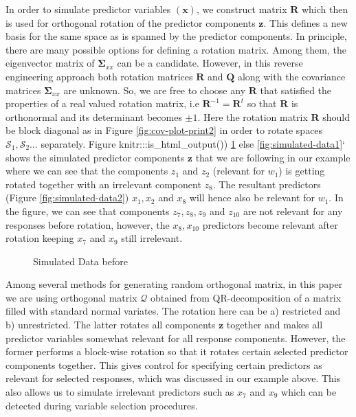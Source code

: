 \documentclass[3p,times,12pt,authoryear]{elsarticle}
\theoremstyle{definition}
\theoremstyle{definition}
\theoremstyle{remark}
\begin{document}
In order to simulate predictor variables \((\mathbf{x})\), we construct
matrix \(\mathbf{R}\) which then is used for orthogonal rotation of the
predictor components \(\mathbf{z}\). This defines a new basis for the
same space as is spanned by the predictor components. In principle,
there are many possible options for defining a rotation matrix. Among
them, the eigenvector matrix of \(\boldsymbol{\Sigma}_{xx}\) can be a
candidate. However, in this reverse engineering approach both rotation
matrices \(\mathbf{R}\) and \(\mathbf{Q}\) along with the covariance
matrices \(\boldsymbol{\Sigma}_{xx}\) are unknown. So, we are free to
choose any \(\mathbf{R}\) that satisfied the properties of a real valued
rotation matrix, i.e \(\mathbf{R}^{-1} = \mathbf{R}^t\) so that
\(\mathbf{R}\) is orthonormal and its determinant becomes \(\pm 1\).
Here the rotation matrix \(\mathbf{R}\) should be block diagonal as in
Figure \ref{fig:cov-plot-print2} in order to rotate spaces
\(\mathcal{S}_1, \mathcal{S}_2 \ldots\) separately. Figure
knitr:::is\_html\_output()) \ref{fig:simulated-data} else
\ref{fig:simulated-data1}` shows the simulated predictor components
\(\mathbf{z}\) that we are following in our example where we can see
that the components \(z_{1}\) and \(z_{2}\) (relevant for \(w_1\)) is
getting rotated together with an irrelevant component \(z_{8}\). The
resultant predictors (Figure \ref{fig:simulated-data2}) \(x_{1}, x_{2}\)
and \(x_{8}\) will hence also be relevant for \(w_1\). In the figure, we
can see that components \(z_{7}, z_{8}, z_{9}\) and \(z_{10}\) are not
relevant for any responses before rotation, however, the
\(x_{8}, x_{10}\) predictors become relevant after rotation keeping
\(x_{7}\) and \(x_{9}\) still irrelevant.

\begin{figure}[!htb]

{\centering {}

}

\caption{Simulated Data before}\label{fig:simulated-data}
\end{figure}

Among several methods
\citep{anderson1987generation, heiberger1978algorithm} for generating
random orthogonal matrix, in this paper we are using orthogonal matrix
\(\mathcal{Q}\) obtained from QR-decomposition of a matrix filled with
standard normal variates. The rotation here can be a) restricted and b)
unrestricted. The latter rotates all components \(\mathbf{z}\) together
and makes all predictor variables somewhat relevant for all response
components. However, the former performs a block-wise rotation so that
it rotates certain selected predictor components together. This gives
control for specifying certain predictors as relevant for selected
responses, which was discussed in our example above. This also allows us
to simulate irrelevant predictors such as \(x_{7}\) and \(x_{9}\) which
can be detected during variable selection procedures.
\end{document}

